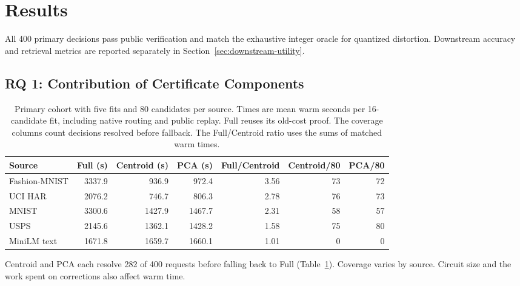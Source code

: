 \documentclass[5p,times,twocolumn]{elsarticle}
\begin{document}

\section{Results}
\label{sec:results}
\label{sec:server-results}
All 400 primary decisions pass public verification and match the
exhaustive integer oracle for quantized distortion. Downstream accuracy
and retrieval metrics are reported separately in
Section~\ref{sec:downstream-utility}.

\subsection{RQ 1: Contribution of Certificate Components}
\begin{table}[tbp]
\centering\small
\caption{Primary cohort with five fits and 80 candidates per source.
Times are mean warm seconds per 16-candidate fit, including native routing
and public replay. Full reuses its old-cost proof. The coverage columns
count decisions resolved before fallback. The Full/Centroid ratio uses
the sums of matched warm times.}
\label{tab:final-main}
\begin{tabular}{@{}lrrrrrr@{}}\toprule
Source & Full (s) & Centroid (s) & PCA (s) & Full/Centroid & Centroid/80 & PCA/80\\
\midrule
Fashion-MNIST & 3337.9 & 936.9 & 972.4 & 3.56 & 73 & 72\\
UCI HAR & 2076.2 & 746.7 & 806.3 & 2.78 & 76 & 73\\
MNIST & 3300.6 & 1427.9 & 1467.7 & 2.31 & 58 & 57\\
USPS & 2145.6 & 1362.1 & 1428.2 & 1.58 & 75 & 80\\
MiniLM text & 1671.8 & 1659.7 & 1660.1 & 1.01 & 0 & 0\\
\bottomrule
\end{tabular}
\end{table}

Centroid and PCA each resolve 282 of 400 requests before falling back to
Full (Table~\ref{tab:final-main}). Coverage varies by source. Circuit size
and the work spent on corrections also affect warm time.
\end{document}
